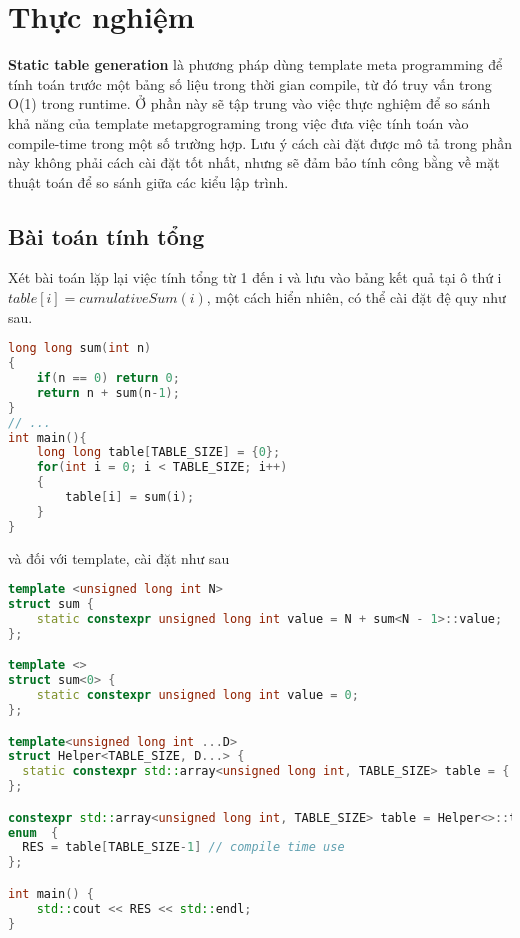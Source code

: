 \section{Thực nghiệm}
\textbf{Static table generation} là phương pháp dùng template meta programming để tính toán trước một bảng số liệu trong thời gian compile, từ đó truy vấn trong O(1) trong runtime. Ở phần này sẽ tập trung vào việc thực nghiệm để so sánh khả năng của template metapgrograming trong việc đưa việc tính toán vào compile-time trong một số trường hợp. Lưu ý cách cài đặt được mô tả trong phần này không phải cách cài đặt tốt nhất, nhưng sẽ đảm bảo tính công bằng về mặt thuật toán để so sánh giữa các kiểu lập trình.
\subsection{Bài toán tính tổng}
Xét bài toán lặp lại việc tính tổng từ 1 đến i và lưu vào bảng kết quả tại ô thứ i $table[i]=cumulativeSum(i)$, một cách hiển nhiên, có thể cài đặt đệ quy như sau.
\begin{lstlisting}[caption={Thử nghiệm tính tổng},label={code:sum},language=C++]
long long sum(int n)
{
    if(n == 0) return 0;
    return n + sum(n-1);
}
// ... 
int main(){
    long long table[TABLE_SIZE] = {0};
    for(int i = 0; i < TABLE_SIZE; i++)
    {
        table[i] = sum(i);
    }
}
\end{lstlisting}
và đối với template, cài đặt như sau 
\begin{lstlisting}[caption={Thử nghiệm tính tổng với template},label={code:sum_template},language=C++]
template <unsigned long int N>
struct sum {
	static constexpr unsigned long int value = N + sum<N - 1>::value;
};

template <>
struct sum<0> {
	static constexpr unsigned long int value = 0;
};

template<unsigned long int ...D>
struct Helper<TABLE_SIZE, D...> {
  static constexpr std::array<unsigned long int, TABLE_SIZE> table = { D... };
};

constexpr std::array<unsigned long int, TABLE_SIZE> table = Helper<>::table;
enum  {
  RES = table[TABLE_SIZE-1] // compile time use
};

int main() {
    std::cout << RES << std::endl; 
}
\end{lstlisting}

